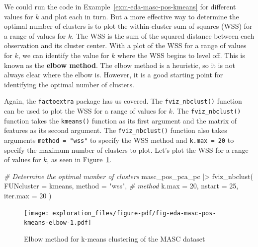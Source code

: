 \documentclass[
  letterpaper,
  DIV=11,
  numbers=noendperiod]{scrreport}
\newenvironment{Shaded}{\begin{snugshade}}{\end{snugshade}}
\newcommand{\AttributeTok}[1]{\textcolor[rgb]{0.00,0.00,0.00}{#1}}
\newcommand{\CommentTok}[1]{\textcolor[rgb]{0.00,0.00,0.00}{\textit{#1}}}
\newcommand{\DecValTok}[1]{\textcolor[rgb]{0.00,0.00,0.00}{#1}}
\newcommand{\FunctionTok}[1]{\textcolor[rgb]{0.00,0.00,0.00}{#1}}
\newcommand{\NormalTok}[1]{\textcolor[rgb]{0.00,0.00,0.00}{#1}}
\newcommand{\SpecialCharTok}[1]{\textcolor[rgb]{0.00,0.00,0.00}{#1}}
\newcommand{\StringTok}[1]{\textcolor[rgb]{0.00,0.00,0.00}{#1}}
\theoremstyle{definition}
\theoremstyle{remark}
\begin{document}
We could run the code in Example~\ref{exm-eda-masc-pos-kmeans} for
different values for \(k\) and plot each in turn. But a more effective
way to determine the optimal number of clusters is to plot the
within-cluster sum of squares (WSS) for a range of values for \(k\). The
WSS is the sum of the squared distance between each observation and its
cluster center. With a plot of the WSS for a range of values for \(k\),
we can identify the value for \(k\) where the WSS begins to level off.
This is known as the \textbf{elbow method}. The elbow method is a
heuristic, so it is not always clear where the elbow is. However, it is
a good starting point for identifying the optimal number of clusters.

Again, the \texttt{factoextra} package has us covered. The
\texttt{fviz\_nbclust()} function can be used to plot the WSS for a
range of values for \(k\). The \texttt{fviz\_nbclust()} function takes
the \texttt{kmeans()} function as its first argument and the matrix of
features as its second argument. The \texttt{fviz\_nbclust()} function
also takes arguments \texttt{method\ =\ "wss"} to specify the WSS method
and \texttt{k.max\ =\ 20} to specify the maximum number of clusters to
plot. Let's plot the WSS for a range of values for \(k\), as seen in
Figure~\ref{fig-eda-masc-pos-kmeans-elbow}.

\begin{Shaded}
\begin{Highlighting}[]
\CommentTok{\# Determine the optimal number of clusters}
\NormalTok{masc\_pos\_pca\_pc }\SpecialCharTok{|\textgreater{}} 
  \FunctionTok{fviz\_nbclust}\NormalTok{(}
    \AttributeTok{FUNcluster =}\NormalTok{ kmeans,}
    \AttributeTok{method =} \StringTok{"wss"}\NormalTok{, }\CommentTok{\# method}
    \AttributeTok{k.max =} \DecValTok{20}\NormalTok{,}
    \AttributeTok{nstart =} \DecValTok{25}\NormalTok{,}
    \AttributeTok{iter.max =} \DecValTok{20}
\NormalTok{  )}
\end{Highlighting}
\end{Shaded}

\begin{figure}[H]

{\centering \texttt{[image: exploration\_files/figure-pdf/fig-eda-masc-pos-kmeans-elbow-1.pdf]}

}

\caption{\label{fig-eda-masc-pos-kmeans-elbow}Elbow method for k-means
clustering of the MASC dataset}

\end{figure}
\end{document}
